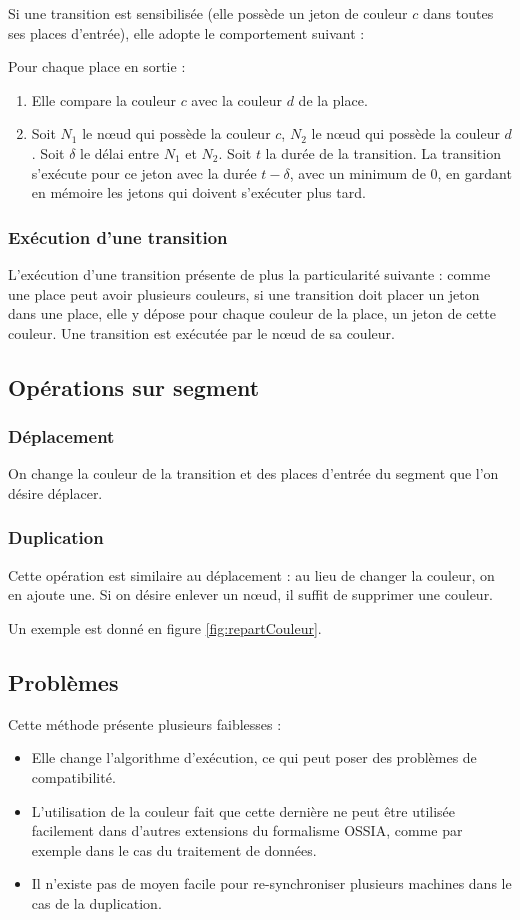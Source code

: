 Si une transition est sensibilisée (elle possède un jeton de couleur $c$ dans toutes ses places d'entrée), elle adopte le comportement suivant : 

Pour chaque place en sortie :
\begin{enumerate}
\item Elle compare la couleur $c$ avec la couleur $d$ de la place. 
\item Soit $N_1$ le nœud qui possède la couleur $c$, $N_2$ le nœud qui possède la couleur $d$. Soit $\delta$ le délai entre $N_1$ et $N_2$. Soit $t$ la durée de la transition. La transition s'exécute pour ce jeton avec la durée $t - \delta$, avec un minimum de 0, en gardant en mémoire les jetons qui doivent s'exécuter plus tard.
\end{enumerate}

\subsubsection{Exécution d'une transition}
L'exécution d'une transition présente de plus la particularité suivante : comme une place peut avoir plusieurs couleurs, si une transition doit placer un jeton dans une place, elle y dépose pour chaque couleur de la place, un jeton de cette couleur. 
Une transition est exécutée par le nœud de sa couleur.

\subsection{Opérations sur segment}
\subsubsection{Déplacement}
On change la couleur de la transition et des places d'entrée du segment que l'on désire déplacer.

\subsubsection{Duplication}
Cette opération est similaire au déplacement : au lieu de changer la couleur, on en ajoute une. Si on désire enlever un nœud, il suffit de supprimer une couleur.

Un exemple est donné en figure \ref{fig:repartCouleur}.

\subsection{Problèmes}
Cette méthode présente plusieurs faiblesses : 
\begin{itemize}
	\item Elle change l'algorithme d'exécution, ce qui peut poser des problèmes de compatibilité.
	\item L'utilisation de la couleur fait que cette dernière ne peut être utilisée facilement dans d'autres extensions du formalisme \ac{OSSIA}, comme par exemple dans le cas du traitement de données\cite{arias2014modelling}.
	\item Il n'existe pas de moyen facile pour re-synchroniser plusieurs machines dans le cas de la duplication.
\end{itemize}

